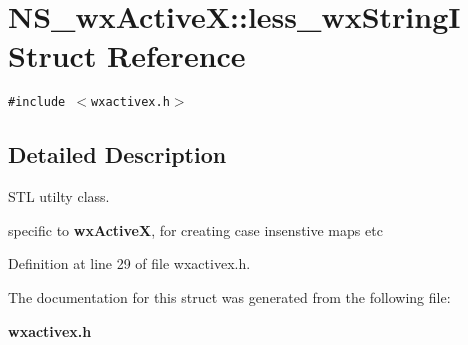 \section{NS\_\-wx\-Active\-X::less\_\-wx\-String\-I Struct Reference}
\label{structNS__wxActiveX_1_1less__wxStringI}
{\tt \#include $<$wxactivex.h$>$}



\subsection{Detailed Description}
STL utilty class.

specific to {\bf wx\-Active\-X}, for creating case insenstive maps etc 



Definition at line 29 of file wxactivex.h.

The documentation for this struct was generated from the following file:\begin{CompactItemize}
\item 
{\bf wxactivex.h}\end{CompactItemize}
